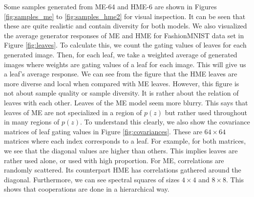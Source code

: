 \documentclass[a4paper,onesided,12pt]{report}
\begin{document}
Some samples generated from ME-64 and HME-6 are shown in Figures \ref{fig:samples_me} to \ref{fig:samples_hme2} for visual inspection. It can be seen that these are quite realistic and contain diversity for both models. We also visualized the average generator responses of ME and HME for FashionMNIST data set in Figure \ref{fig:leaves}. To calculate this, we count the gating values of leaves for each generated image. Then, for each leaf, we take a weighted average of generated images where weights are gating values of a leaf for each image. This will give us a leaf's average response. We can see from the figure that the HME leaves are more diverse and local when compared with ME leaves. However, this figure is not about sample quality or sample diversity. It is rather about the relation of leaves with each other. Leaves of the ME model seem more blurry. This says that leaves of ME are not specialized in a region of $p(z)$ but rather used throughout in many regions of $p(z)$. To understand this clearly, we also show the covariance matrices of leaf gating values in Figure \ref{fig:covariances}. These are $64 \times 64$ matrices where each index corresponds to a leaf. For example, for both matrices, we see that the diagonal values are higher than others. This implies leaves are rather used alone, or used with high proportion. For ME, correlations are randomly scattered. Its counterpart HME has correlations gathered around the diagonal. Furthermore, we can see spectral squares of sizes $4 \times 4$ and $8 \times 8$. This shows that cooperations are done in a hierarchical way.
\end{document}
